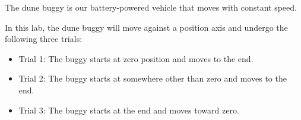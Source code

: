 \documentclass[answers]{exam}
\begin{document}
The dune buggy is our battery-powered vehicle that moves with constant speed. 

\begin{center}
\end{center}

In this lab, the dune buggy will move against a position axis and undergo the following three trials:

\begin{itemize}
    \item Trial 1: The buggy starts at zero position and moves to the end.
    \item Trial 2: The buggy starts at somewhere other than zero and moves to the end.
    \item Trial 3: The buggy starts at the end and moves toward zero.
\end{itemize}
\end{document}
